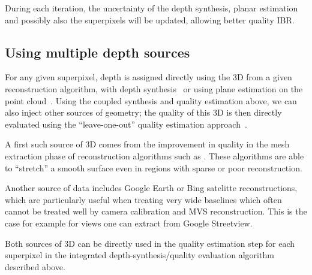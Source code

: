 During each iteration, the uncertainty of the depth synthesis, planar estimation and possibly also the superpixels will be updated, allowing better quality IBR.

\subsection{Using multiple depth sources}

For any given superpixel, depth is assigned directly using the 3D from 
a given reconstruction algorithm, with depth synthesis~\cite{chaurasia13} or
using plane estimation on the point cloud~\cite{ODD15}. Using the coupled synthesis and quality
estimation above, we can also inject other sources of geometry; the quality
of this 3D is then directly evaluated using the ``leave-one-out'' quality estimation
approach~\cite{ODD15}.

A first such source of 3D comes from the improvement in quality in the mesh extraction phase 
of reconstruction algorithms such as \cite{jancosek2011multi,keriven}. 
These algorithms are able to ``stretch'' a smooth surface even in regions with sparse or
poor reconstruction. 

Another source of data includes Google Earth or Bing satelitte reconstructions, which are particularly useful when treating very wide baselines which often cannot be treated well by camera calibration and MVS
reconstruction. This is the case for example for views
one can extract from Google Streetview. 

Both sources of 3D can be directly used in the quality estimation step for each superpixel in the
integrated depth-synthesis/quality evaluation algorithm described above.


